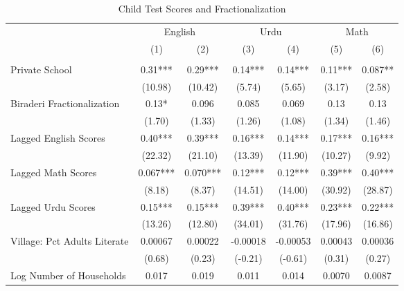 \begin{sidewaystable}[htbp]\centering
\def\sym#1{\ifmmode^{#1}\else\(^{#1}\)\fi}
\caption{Child Test Scores and Fractionalization \label{kidsnointeract}}
\begin{tabular}{l*{6}{c}}
\toprule
                &\multicolumn{2}{c}{English}&\multicolumn{2}{c}{Urdu} &\multicolumn{2}{c}{Math} \\\cmidrule(lr){2-3}\cmidrule(lr){4-5}\cmidrule(lr){6-7}
                &\multicolumn{1}{c}{(1)}&\multicolumn{1}{c}{(2)}&\multicolumn{1}{c}{(3)}&\multicolumn{1}{c}{(4)}&\multicolumn{1}{c}{(5)}&\multicolumn{1}{c}{(6)}\\
                &\multicolumn{1}{c}{}&\multicolumn{1}{c}{}&\multicolumn{1}{c}{}&\multicolumn{1}{c}{}&\multicolumn{1}{c}{}&\multicolumn{1}{c}{}\\
\midrule
Private School  &     0.31***&     0.29***&     0.14***&     0.14***&     0.11***&    0.087** \\
                &  (10.98)   &  (10.42)   &   (5.74)   &   (5.65)   &   (3.17)   &   (2.58)   \\
Biraderi Fractionalization&     0.13*  &    0.096   &    0.085   &    0.069   &     0.13   &     0.13   \\
                &   (1.70)   &   (1.33)   &   (1.26)   &   (1.08)   &   (1.34)   &   (1.46)   \\
Lagged English Scores&     0.40***&     0.39***&     0.16***&     0.14***&     0.17***&     0.16***\\
                &  (22.32)   &  (21.10)   &  (13.39)   &  (11.90)   &  (10.27)   &   (9.92)   \\
Lagged Math Scores&    0.067***&    0.070***&     0.12***&     0.12***&     0.39***&     0.40***\\
                &   (8.18)   &   (8.37)   &  (14.51)   &  (14.00)   &  (30.92)   &  (28.87)   \\
Lagged Urdu Scores&     0.15***&     0.15***&     0.39***&     0.40***&     0.23***&     0.22***\\
                &  (13.26)   &  (12.80)   &  (34.01)   &  (31.76)   &  (17.96)   &  (16.86)   \\
Village: Pct Adults Literate&  0.00067   &  0.00022   & -0.00018   & -0.00053   &  0.00043   &  0.00036   \\
                &   (0.68)   &   (0.23)   &  (-0.21)   &  (-0.61)   &   (0.31)   &   (0.27)   \\
Log Number of Households&    0.017   &    0.019   &    0.011   &    0.014   &   0.0070   &   0.0087   \\

\end{tabular}
\end{sidewaystable}
